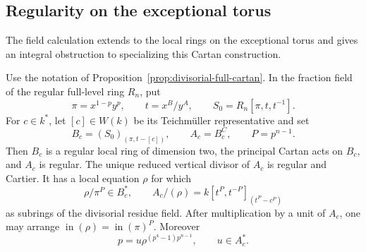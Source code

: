 \subsection{Regularity on the exceptional torus}\label{sec:cartan-torus-regularity}
The field calculation extends to the local rings on the exceptional torus and gives an integral obstruction to specializing this Cartan construction.

\begin{proposition}\label{prop:cartan-torus-regularity}
Use the notation of Proposition~\ref{prop:divisorial-full-cartan}. In the fraction field of the regular full-level ring $R_n$, put
\[
 \pi=x^{1-p}y^p,\qquad t=x^B/y^A,\qquad
 S_0=R_n[\pi,t,t^{-1}].
\]
For $c\in k^*$, let $[c]\in W(k)$ be its Teichm\"uller representative and set
\[
 B_c=(S_0)_{(\pi,t-[c])},\qquad A_c=B_c^C,
 \qquad P=p^{n-1}.
\]
Then $B_c$ is a regular local ring of dimension two, the principal Cartan acts on $B_c$, and $A_c$ is regular. The unique reduced vertical divisor of $A_c$ is regular and Cartier. It has a local equation $\rho$ for which
\[
 \rho/\pi^P\in B_c^*,\qquad
 A_c/(\rho)=k[t^P,t^{-P}]_{(t^P-c^P)}
\]
as subrings of the divisorial residue field. After multiplication by a unit of $A_c$, one may arrange $\operatorname{in}(\rho)=\operatorname{in}(\pi)^P$. Moreover
\begin{equation}\label{eq:cartan-torus-p-factorization}
 p=u\rho^{(p^4-1)p^{n-1}},\qquad u\in A_c^*.
\end{equation}
\end{proposition}

